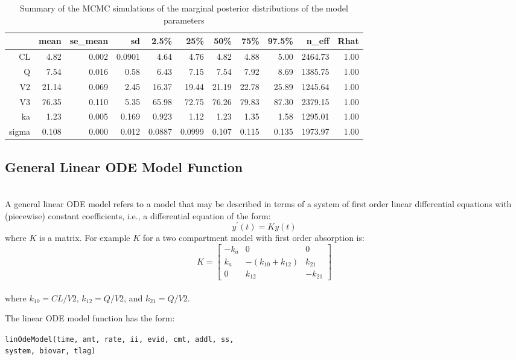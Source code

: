 \documentclass[11pt]{amsart}
\begin{document}
\begin{table}[!htb]
\centering
\caption{Summary of the MCMC simulations of the marginal posterior distributions of the model parameters}
\begin{tabular}{rrrrrrrrrrr}
  \hline
 & mean & se\_mean & sd & 2.5\% & 25\% & 50\% & 75\% & 97.5\% & n\_eff & Rhat \\ 
  \hline
CL & 4.82 & 0.002 & 0.0901 & 4.64 & 4.76 & 4.82 & 4.88 & 5.00 & 2464.73 & 1.00 \\ 
  Q & 7.54 & 0.016 & 0.58 & 6.43 & 7.15 & 7.54 & 7.92 & 8.69 & 1385.75 & 1.00 \\ 
  V2 & 21.14 & 0.069 & 2.45 & 16.37 & 19.44 & 21.19 & 22.78 & 25.89 & 1245.64 & 1.00 \\ 
  V3 & 76.35 & 0.110 & 5.35 & 65.98 & 72.75 & 76.26 & 79.83 & 87.30 & 2379.15 & 1.00 \\ 
  ka & 1.23 & 0.005 & 0.169 & 0.923 & 1.12 & 1.23 & 1.35 & 1.58 & 1295.01 & 1.00 \\
  sigma & 0.108 &  0.000 & 0.012 & 0.0887 & 0.0999 & 0.107 & 0.115 & 0.135 & 1973.97 & 1.00 \\
   \hline
\end{tabular}
\end{table}

\subsection{General Linear ODE Model Function} \ \\

A general linear ODE model refers to a model that may be described in terms of a system of first order linear differential equations with (piecewise) constant coefficients, i.e., a differential equation of the form:
$$ y^\prime\left(t\right) = Ky\left(t\right) $$
where $K$ is a matrix. For example $K$ for a two compartment model with first order absorption is:
$$   K = \left[\begin{array}{ccc}
	-k_a & 0 & 0 \\
	k_a & -\left(k_{10} + k_{12}\right) & k_{21} \\
	0 & k_{12} & -k_{21}
	\end{array}\right] $$ \\
where $k_{10} = CL / V2 $, $ k_{12} = Q / V2 $, and $k_{21} = Q / V2 $.

The linear ODE model function has the form:

\texttt{linOdeModel(time, amt, rate, ii, evid, cmt, addl, ss,\\
\phantom{linOdeModel} system, biovar, tlag)}
\end{document}
